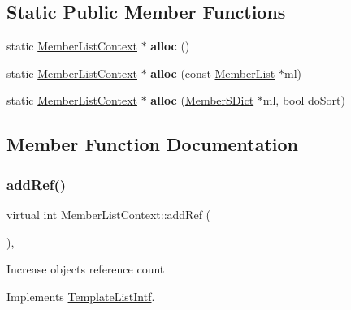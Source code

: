 \subsection*{Static Public Member Functions}
\begin{DoxyCompactItemize}
\item 
\mbox{\label{class_member_list_context_ab6e43b0940cb35a1c826694a5ed9bece}} 
static \mbox{\hyperlink{class_member_list_context}{Member\+List\+Context}} $\ast$ {\bfseries alloc} ()
\item 
\mbox{\label{class_member_list_context_aeb87e6f772040b1819247c00b72dff1b}} 
static \mbox{\hyperlink{class_member_list_context}{Member\+List\+Context}} $\ast$ {\bfseries alloc} (const \mbox{\hyperlink{class_member_list}{Member\+List}} $\ast$ml)
\item 
\mbox{\label{class_member_list_context_ad231ed88d19218b0236800e6400f8ff3}} 
static \mbox{\hyperlink{class_member_list_context}{Member\+List\+Context}} $\ast$ {\bfseries alloc} (\mbox{\hyperlink{class_member_s_dict}{Member\+S\+Dict}} $\ast$ml, bool do\+Sort)
\end{DoxyCompactItemize}


\subsection{Member Function Documentation}
\mbox{\label{class_member_list_context_a2ee8c2892871175c21a47ae4aaed9218}} 
\subsubsection{\texorpdfstring{addRef()}{addRef()}}
{\footnotesize\ttfamily virtual int Member\+List\+Context\+::add\+Ref (\begin{DoxyParamCaption}{ }\end{DoxyParamCaption})\hspace{0.3cm}{\ttfamily [inline]}, {\ttfamily [virtual]}}

Increase object\textquotesingle{}s reference count 

Implements \mbox{\hyperlink{class_template_list_intf_a4b4973e2e15396d10bc4e3085462ca2b}{Template\+List\+Intf}}.

